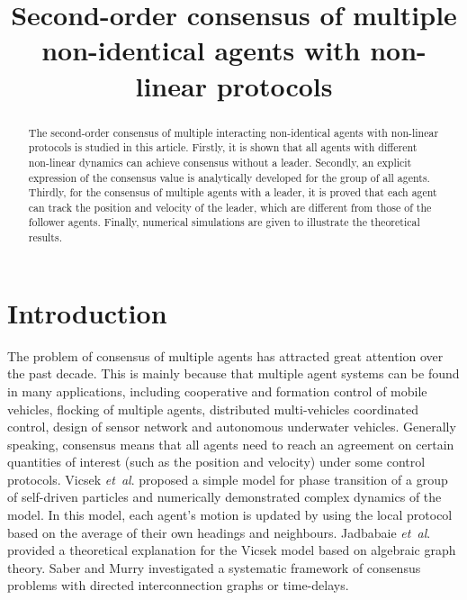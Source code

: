 \documentclass{cta-author}
\begin{document}

\title{Second-order consensus of multiple non-identical agents with non-linear protocols}

\author{  }

\address{
}

\begin{abstract}
 The second-order consensus of multiple
interacting non-identical agents with non-linear protocols is studied in this article.
Firstly, it is shown that all agents with different non-linear
dynamics can achieve consensus without a leader. Secondly, an
explicit expression of the consensus value is analytically developed
for the group of all agents. Thirdly, for the consensus of multiple
agents with a leader, it is proved that each agent can track the
position and velocity of the leader, which are different from those
of the follower agents. Finally, numerical simulations are given to
illustrate the theoretical results.
\end{abstract}

\maketitle

\section{Introduction}\label{sec1}

The problem of consensus of multiple agents has attracted great
attention over the past decade. This is mainly because that multiple agent
systems can be found in many applications, including cooperative and
formation control of mobile vehicles, flocking of multiple agents,
distributed multi-vehicles coordinated control, design of sensor
network and autonomous underwater vehicles. Generally speaking, consensus means
that all agents need to reach an agreement on certain quantities of
interest (such as the position and velocity) under some control
protocols. Vicsek \textit{et~al}.  proposed a simple
model for phase transition of a group of self-driven particles and
numerically demonstrated complex dynamics of the model. In this
model, each agent's motion is updated by using the local protocol
based on the average of their own headings and neighbours.
Jadbabaie \textit{et~al}.  provided a theoretical
explanation for the Vicsek model based on algebraic graph theory.
Saber and Murry  investigated a systematic
framework of consensus problems with directed interconnection graphs
or time-delays.
\end{document}
